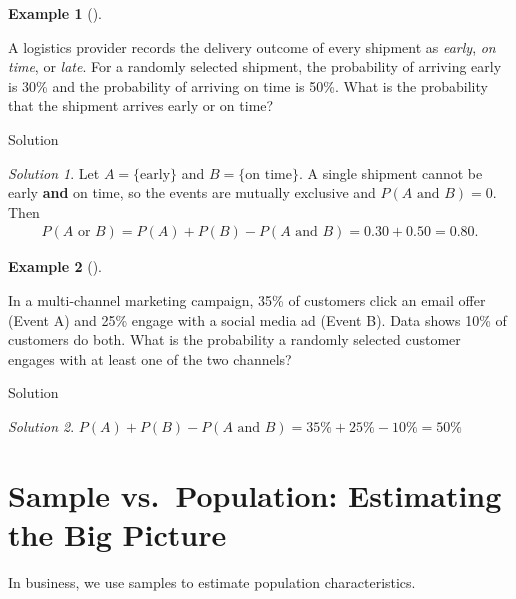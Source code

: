 \documentclass[
  12pt,
  a4paper,
]{scrbook}
\theoremstyle{plain}
\theoremstyle{definition}
\newtheorem{example}{Example}[chapter]
\theoremstyle{remark}
\newtheorem{refsolution}{Solution}[chapter]
\begin{document}
\begin{example}[]\protect\hypertarget{exm-1}{}\label{exm-1}

A logistics provider records the delivery outcome of every shipment as
\emph{early}, \emph{on time}, or \emph{late}. For a randomly selected
shipment, the probability of arriving early is 30\% and the probability
of arriving on time is 50\%. What is the probability that the shipment
arrives early or on time?

\end{example}

Solution

\begin{refsolution}
Let \(A=\{\text{early}\}\) and \(B=\{\text{on time}\}.\) A single
shipment cannot be early \textbf{and} on time, so the events are
mutually exclusive and \(P(A \text{ and } B)=0.\) Then \[
\begin{split}
P(A \text{ or } B) = P(A)+P(B)-P(A \text{ and } B)=0.30+0.50=0.80.
\end{split}
\]

\label{sol-1}

\end{refsolution}

\begin{example}[]\protect\hypertarget{exm-2}{}\label{exm-2}

In a multi-channel marketing campaign, 35\% of customers click an email
offer (Event A) and 25\% engage with a social media ad (Event B). Data
shows 10\% of customers do both. What is the probability a randomly
selected customer engages with at least one of the two channels?

\end{example}

Solution

\begin{refsolution}
\leavevmode

\(P(A) + P(B) - P(A \text{ and } B) = 35\% + 25\% - 10\% = 50\%\)

\label{sol-2}

\end{refsolution}

\section{Sample vs.~Population: Estimating the Big
Picture}\label{sample-vs.-population-estimating-the-big-picture}

In business, we use samples to estimate population characteristics.
\end{document}
